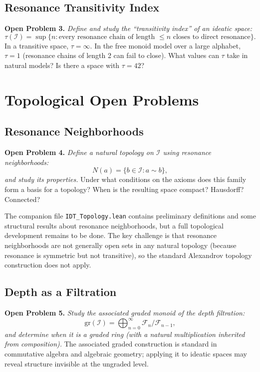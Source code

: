 \documentclass[11pt,openany]{book}
\theoremstyle{definition}
\theoremstyle{plain}
\theoremstyle{remark}
\newcommand{\IS}{\mathcal{I}}               %
\newcommand{\res}{\sim}                      %
\newcommand{\Filt}[1]{\mathcal{F}_{#1}}     %
\begin{document}
\subsection{Resonance Transitivity Index}

\textbf{Open Problem 3.} \emph{Define and study the ``transitivity index'' of an ideatic space:}
\[
\tau(\IS) = \sup \{ n : \text{every resonance chain of length } \leq n \text{ closes to direct resonance}\}.
\]
In a transitive space, $\tau = \infty$. In the free monoid model over a large alphabet, $\tau = 1$ (resonance chains of length 2 can fail to close). What values can $\tau$ take in natural models? Is there a space with $\tau = 42$?

\section{Topological Open Problems}

\subsection{Resonance Neighborhoods}

\textbf{Open Problem 4.} \emph{Define a natural topology on $\IS$ using resonance neighborhoods:}
\[
N(a) = \{b \in \IS : a \res b\},
\]
\emph{and study its properties.} Under what conditions on the axioms does this family form a basis for a topology? When is the resulting space compact? Hausdorff? Connected?

The companion file \texttt{IDT\_Topology.lean} contains preliminary definitions and some structural results about resonance neighborhoods, but a full topological development remains to be done. The key challenge is that resonance neighborhoods are not generally open sets in any natural topology (because resonance is symmetric but not transitive), so the standard Alexandrov topology construction does not apply.

\subsection{Depth as a Filtration}

\textbf{Open Problem 5.} \emph{Study the associated graded monoid of the depth filtration:}
\[
\mathrm{gr}(\IS) = \bigoplus_{n=0}^{\infty} \Filt{n} / \Filt{n-1},
\]
\emph{and determine when it is a graded ring (with a natural multiplication inherited from composition).} The associated graded construction is standard in commutative algebra and algebraic geometry; applying it to ideatic spaces may reveal structure invisible at the ungraded level.
\end{document}
